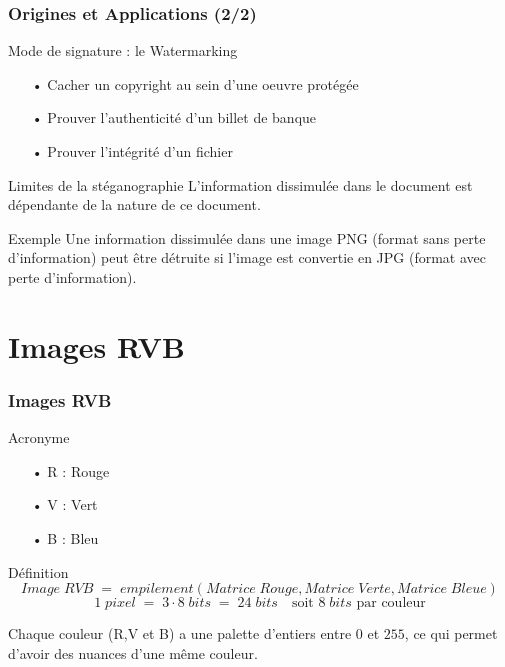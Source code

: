 \documentclass{beamer}
\begin{document}
\begin{frame}
\frametitle{Origines et Applications (2/2)} 

\begin{block}{Mode de signature : le Watermarking}
\begin{itemize}
    \item[•] Cacher un copyright au sein d'une oeuvre protégée 
    \item[•] Prouver l'authenticité d'un billet de banque 
    \item[•] Prouver l'intégrité d'un fichier
\end{itemize}
\end{block}

\begin{alertblock}{Limites de la stéganographie}
L'information dissimulée dans le document est dépendante de la nature de ce document.
\end{alertblock}

\begin{exampleblock}{Exemple}
Une information dissimulée dans une image PNG (format sans perte d'information) peut être détruite si l'image est convertie en JPG (format avec perte d'information).
\end{exampleblock}
\end{frame}

\section{Images RVB}
\begin{frame}
\frametitle{Images RVB}

\begin{block}{Acronyme}
\begin{itemize}
    \item[•] R : Rouge
    \item[•] V : Vert
    \item[•] B : Bleu
\end{itemize}
\end{block}

\begin{block}{Définition}
\[ Image \; RVB \; = \; empilement(Matrice \; Rouge, Matrice \; Verte, Matrice \; Bleue) \]
\[ 1 \; pixel \; = \; 3 \cdot 8 \; bits \; = \; 24 \; bits \quad \text{soit }  8 \; bits \text{ par couleur} \]

Chaque couleur (R,V et B) a une palette d'entiers entre $ 0 $ et $ 255 $, ce qui permet d'avoir des nuances d'une même couleur.
\end{block}
\end{frame}
\end{document}
